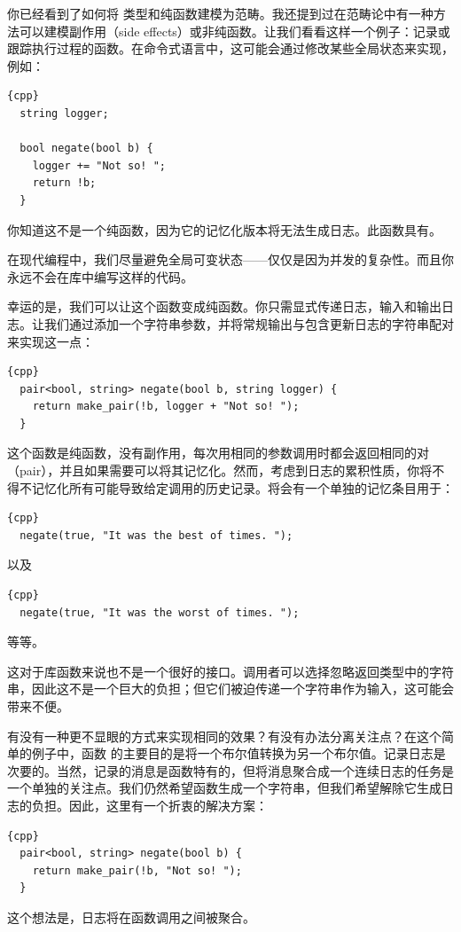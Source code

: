 
\lettrine[lhang=0.17]{你}{已经看到了如何将} 类型和纯函数建模为范畴。我还提到过在范畴论中有一种方法可以建模副作用（side effects）或非纯函数。让我们看看这样一个例子：记录或跟踪执行过程的函数。在命令式语言中，这可能会通过修改某些全局状态来实现，例如：

\begin{lstlisting}{cpp}
  string logger;

  bool negate(bool b) {
    logger += "Not so! ";
    return !b;
  }
\end{lstlisting}
你知道这不是一个纯函数，因为它的记忆化版本将无法生成日志。此函数具有。

在现代编程中，我们尽量避免全局可变状态——仅仅是因为并发的复杂性。而且你永远不会在库中编写这样的代码。

幸运的是，我们可以让这个函数变成纯函数。你只需显式传递日志，输入和输出日志。让我们通过添加一个字符串参数，并将常规输出与包含更新日志的字符串配对来实现这一点：

\begin{lstlisting}{cpp}
  pair<bool, string> negate(bool b, string logger) {
    return make_pair(!b, logger + "Not so! ");
  }
\end{lstlisting}
这个函数是纯函数，没有副作用，每次用相同的参数调用时都会返回相同的对（pair），并且如果需要可以将其记忆化。然而，考虑到日志的累积性质，你将不得不记忆化所有可能导致给定调用的历史记录。将会有一个单独的记忆条目用于：

\begin{lstlisting}{cpp}
  negate(true, "It was the best of times. ");
\end{lstlisting}
以及

\begin{lstlisting}{cpp}
  negate(true, "It was the worst of times. ");
\end{lstlisting}
等等。

这对于库函数来说也不是一个很好的接口。调用者可以选择忽略返回类型中的字符串，因此这不是一个巨大的负担；但它们被迫传递一个字符串作为输入，这可能会带来不便。

有没有一种更不显眼的方式来实现相同的效果？有没有办法分离关注点？在这个简单的例子中，函数  的主要目的是将一个布尔值转换为另一个布尔值。记录日志是次要的。当然，记录的消息是函数特有的，但将消息聚合成一个连续日志的任务是一个单独的关注点。我们仍然希望函数生成一个字符串，但我们希望解除它生成日志的负担。因此，这里有一个折衷的解决方案：

\begin{lstlisting}{cpp}
  pair<bool, string> negate(bool b) {
    return make_pair(!b, "Not so! ");
  }
\end{lstlisting}
这个想法是，日志将在函数调用之间被聚合。

